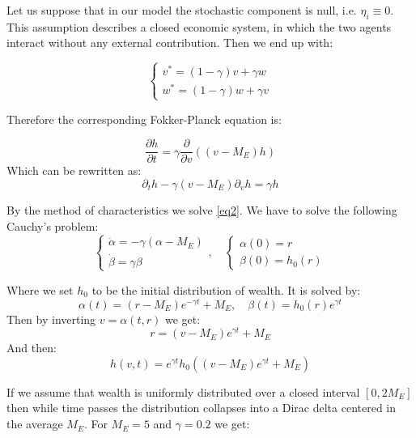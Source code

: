 \documentclass[12pt,a4paper]{article}
\numberwithin{theorem}{section}
\numberwithin{definition}{section}
\numberwithin{example}{section}
\numberwithin{exercise}{section}
\begin{document}
Let us suppose that in our model the stochastic component is null, i.e. $\eta_i\equiv0$. This assumption describes a closed economic system, in which the two agents interact without any external contribution. Then we end up with:

\[\begin{cases}
v^{*}=\left(1-\gamma\right)v+\gamma w \\
w^{*}=\left(1-\gamma\right)w+\gamma v
\end{cases}\]

Therefore the corresponding Fokker-Planck equation is:

\begin{equation}
    \frac{\partial h}{\partial t}=\gamma\frac{\partial}{\partial v}((v-M_E)h)
\end{equation}
Which can be rewritten as:
\begin{equation}\label{eq2}
    \partial_th-\gamma (v-M_E)\partial_v h=\gamma h
\end{equation}

By the method of characteristics we solve \ref{eq2}. We have to solve the following Cauchy's problem:
\[\begin{cases}
\dot{\alpha}=-\gamma (\alpha - M_E) \\
\dot{\beta}=\gamma \beta
\end{cases},\quad \begin{cases}
\alpha(0)=r \\
\beta(0)=h_0(r)
\end{cases}\]

Where we set $h_0$ to be the initial distribution of wealth. It is solved by:
    \[\alpha(t)=(r-M_E)e^{-\gamma t}+M_E,\quad \beta(t)=h_0(r)e^{\gamma t}\]
Then by inverting $v=\alpha(t,r)$ we get:
\[r=(v-M_E)e^{\gamma t}+M_E\]
And then:
\[h(v,t)=e^{\gamma t}h_0\left((v-M_E)e^{\gamma t}+M_E\right)\]

If we assume that wealth is uniformly distributed over a closed interval $[0,2M_E]$ then while time passes the distribution collapses into a Dirac delta centered in the average $M_E$. For $M_E=5$ and $\gamma=0.2$ we get:


\nocite{FKL}
\printbibliography



\vspace{10mm}
\end{document}
